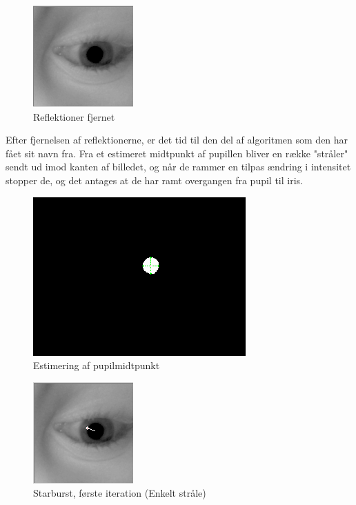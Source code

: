 \documentclass[rapport.tex]{subfiles}
\begin{document}
	\begin{figure}
	\centering
	\includegraphics[width=0.4\linewidth]{Billeder/CroppedEye,Reflectionremoved.png}
	\caption{Reflektioner fjernet}
	\label{fig:CroppedEye,Reflectionremoved}
	\end{figure}
	
	Efter fjernelsen af reflektionerne, er det tid til den del af algoritmen som den har fået sit navn fra. Fra et estimeret midtpunkt af pupillen bliver en række "stråler" sendt ud imod kanten af billedet, og når de rammer en tilpas ændring i intensitet stopper de, og det antages at de har ramt overgangen fra pupil til iris.
		
	\begin{figure}
	\centering
	\includegraphics[width=0.4\linewidth]{Billeder/PupilThresholding}
	\caption{Estimering af pupilmidtpunkt}
	\label{fig:PupilThresholding}
	\end{figure}
		
		
		
	\begin{figure}
	\raggedright
	\includegraphics[width=0.4\linewidth]{Billeder/Starburst,Firstsingle.png}
	\caption{Starburst, første iteration (Enkelt stråle)}
	\label{fig:Starburst,Firstsingle}
	\end{figure}	
		
\end{document}
